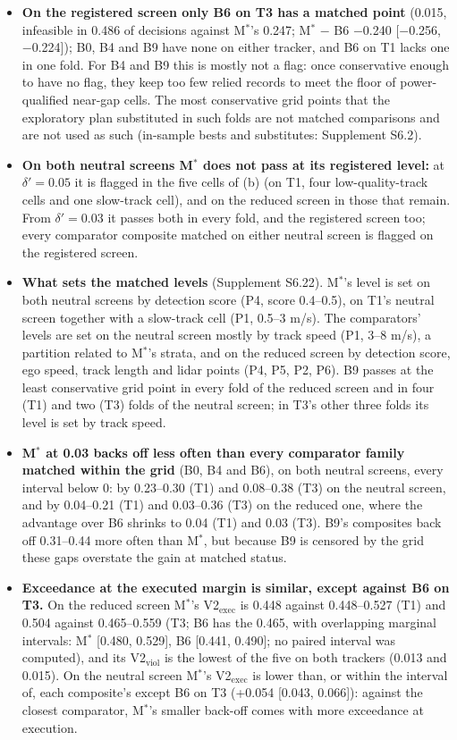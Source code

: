 \documentclass{ieeeaccess}
\begin{document}
\begin{itemize}
\item \textbf{On the registered screen only B6 on T3 has a matched point} (0.015, infeasible in 0.486 of decisions against M$^{*}$'s 0.247; M$^{*}$ $-$ B6 $-$0.240 [$-$0.256, $-$0.224]); B0, B4 and B9 have none on either tracker, and B6 on T1 lacks one in one fold. For B4 and B9 this is mostly not a flag: once conservative enough to have no flag, they keep too few relied records to meet the floor of power-qualified near-gap cells. The most conservative grid points that the exploratory plan substituted in such folds are not matched comparisons and are not used as such (in-sample bests and substitutes: Supplement S6.2).
\item \textbf{On both neutral screens M$^{*}$ does not pass at its registered level:} at $\delta' = 0.05$ it is flagged in the five cells of (b) (on T1, four low-quality-track cells and one slow-track cell), and on the reduced screen in those that remain. From $\delta' = 0.03$ it passes both in every fold, and the registered screen too; every comparator composite matched on either neutral screen is flagged on the registered screen.
\item \textbf{What sets the matched levels} (Supplement S6.22). M$^{*}$'s level is set on both neutral screens by detection score (P4, score 0.4--0.5), on T1's neutral screen together with a slow-track cell (P1, 0.5--3 m/s). The comparators' levels are set on the neutral screen mostly by track speed (P1, 3--8 m/s), a partition related to M$^{*}$'s strata, and on the reduced screen by detection score, ego speed, track length and lidar points (P4, P5, P2, P6). B9 passes at the least conservative grid point in every fold of the reduced screen and in four (T1) and two (T3) folds of the neutral screen; in T3's other three folds its level is set by track speed.
\item \textbf{M$^{*}$ at 0.03 backs off less often than every comparator family matched within the grid} (B0, B4 and B6), on both neutral screens, every interval below 0: by 0.23--0.30 (T1) and 0.08--0.38 (T3) on the neutral screen, and by 0.04--0.21 (T1) and 0.03--0.36 (T3) on the reduced one, where the advantage over B6 shrinks to 0.04 (T1) and 0.03 (T3). B9's composites back off 0.31--0.44 more often than M$^{*}$, but because B9 is censored by the grid these gaps overstate the gain at matched status.
\item \textbf{Exceedance at the executed margin is similar, except against B6 on T3.} On the reduced screen M$^{*}$'s V2$_{\mathrm{exec}}$ is 0.448 against 0.448--0.527 (T1) and 0.504 against 0.465--0.559 (T3; B6 has the 0.465, with overlapping marginal intervals: M$^{*}$ [0.480, 0.529], B6 [0.441, 0.490]; no paired interval was computed), and its V2$_{\mathrm{viol}}$ is the lowest of the five on both trackers (0.013 and 0.015). On the neutral screen M$^{*}$'s V2$_{\mathrm{exec}}$ is lower than, or within the interval of, each composite's except B6 on T3 (+0.054 [0.043, 0.066]): against the closest comparator, M$^{*}$'s smaller back-off comes with more exceedance at execution.

\end{itemize}
\end{document}
